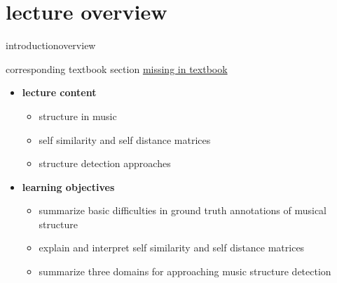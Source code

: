 




\subtitle{Module 11.0: Music Structure Detection}


	

    \section[overview]{lecture overview}
        \begin{frame}{introduction}{overview}
            \begin{block}{corresponding textbook section}
                    \href{http://ieeexplore.ieee.org/xpl/articleDetails.jsp?arnumber=6331122}{missing in textbook} 
            \end{block}

            \begin{itemize}
                \item   \textbf{lecture content}
                    \begin{itemize}
                        \item   structure in music
                        \item   self similarity and self distance matrices
                        \item   structure detection approaches
                    \end{itemize}
                \bigskip
                \item<2->   \textbf{learning objectives}
                    \begin{itemize}
                        \item   summarize basic difficulties in ground truth annotations of musical structure
                        \item   explain and interpret self similarity and self distance matrices
                        \item   summarize three domains for approaching music structure detection
                    \end{itemize}
            \end{itemize}
        \end{frame}

